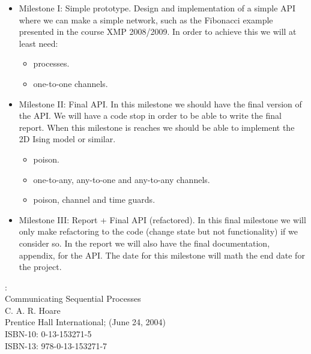 \documentclass[a4paper,12pt]{article}
\begin{document}
\begin{itemize}
 \item Milestone I: Simple prototype. Design and implementation of a simple API
   where we can make a simple network, such as the Fibonacci example presented
   in the course XMP 2008/2009. In order to achieve this we will at least need:
   \begin{itemize}
     \item processes.
     \item one-to-one channels.
   \end{itemize}
 \item Milestone II: Final API. In this milestone we should
   have the final version of the API. We will have a code stop in order to be
   able to write the final report. When this milestone is reaches we should be
   able to implement the 2D Ising model or similar.
   \begin{itemize}
     \item poison.
     \item one-to-any, any-to-one and any-to-any channels.
     \item poison, channel and time guards.
   \end{itemize}
 \item Milestone III: Report + Final API (refactored). In this final
   milestone we will only make refactoring to the code (change state but not
   functionality) if we consider so. In the report we will also have the final
   documentation, appendix, for the API. The date for this milestone will math
   the end date for the project.
\end{itemize}

\begin{thebibliography}{99}

:\\
Communicating Sequential Processes\\
C. A. R. Hoare\\
Prentice Hall International; (June 24, 2004)\\
ISBN-10: 0-13-153271-5\\
ISBN-13: 978-0-13-153271-7

\end{thebibliography}
\end{document}
